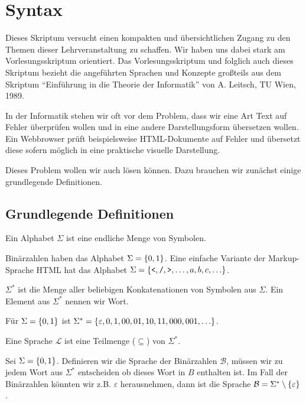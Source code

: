 \chapter{Syntax}
Dieses Skriptum versucht einen kompakten und übersichtlichen Zugang zu den Themen
dieser Lehrveranstaltung zu schaffen.
Wir haben uns dabei stark am Vorlesungsskriptum orientiert.
Das Vorlesungsskriptum und folglich auch dieses Skriptum bezieht die angeführten
Sprachen und Konzepte großteils aus dem Skriptum ``Einführung in die Theorie der Informatik'' von A. Leitsch, TU Wien, 1989.

In der Informatik stehen wir oft vor dem Problem, dass wir eine Art Text auf
Fehler überprüfen wollen und in eine andere Darstellungsform übersetzen wollen.
Ein Webbrowser prüft beispielsweise HTML-Dokumente auf Fehler und übersetzt diese
sofern möglich in eine praktische visuelle Darstellung.

Dieses Problem wollen wir auch lösen können. Dazu brauchen wir zunächst einige grundlegende Definitionen.

\section{Grundlegende Definitionen}
\begin{defn}[Alphabet]
Ein Alphabet $\Sigma$ ist eine endliche Menge von Symbolen.
\end{defn}

Binärzahlen haben das Alphabet $\Sigma=\left\{0,1\right\}$.
Eine einfache Variante der Markup-Sprache HTML hat das Alphabet $\Sigma=\left\{\texttt{<},\texttt{/},\texttt{>},\ldots,a,b,c,\ldots\right\}$.

\begin{defn}
$\Sigma^*$ ist die Menge aller beliebigen Konkatenationen von Symbolen aus $\Sigma$.
Ein Element aus $\Sigma^*$ nennen wir Wort.
\end{defn}

Für $\Sigma=\left\{0,1\right\}$ ist $\Sigma^*=\left\{\varepsilon,0,1,00,01,10,11,000,001,\ldots\right\}$.

\begin{defn}[Sprache]
Eine Sprache $\mathcal{L}$ ist eine Teilmenge ($\subseteq$) von $\Sigma^*$.
\end{defn}

Sei $\Sigma=\left\{0,1\right\}$. Definieren wir die Sprache der Binärzahlen $\mathcal{B}$,
müssen wir zu jedem Wort aus $\Sigma^*$ entscheiden ob dieses Wort in $B$ enthalten ist.
Im Fall der Binärzahlen könnten wir z.B. $\varepsilon$ herausnehmen, dann ist die Sprache
$\mathcal{B}=\Sigma^* \setminus \left\{\varepsilon\right\}$.


